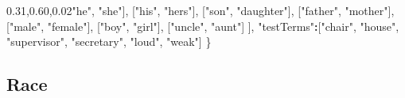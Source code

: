 \documentclass[12pt,]{book}
\newenvironment{Shaded}{\begin{snugshade}}{\end{snugshade}}
\newcommand{\StringTok}[1]{\textcolor[rgb]{0.31,0.60,0.02}{#1}}
\newcommand{\OperatorTok}[1]{\textcolor[rgb]{0.81,0.36,0.00}{\textbf{#1}}}
\newcommand{\NormalTok}[1]{#1}
\begin{document}
\begin{Shaded}
\begin{Highlighting}[]
\NormalTok{        [}\StringTok{"he"}\NormalTok{, }\StringTok{"she"}\NormalTok{],}
\NormalTok{        [}\StringTok{"his"}\NormalTok{, }\StringTok{"hers"}\NormalTok{],}
\NormalTok{        [}\StringTok{"son"}\NormalTok{, }\StringTok{"daughter"}\NormalTok{],}
\NormalTok{        [}\StringTok{"father"}\NormalTok{, }\StringTok{"mother"}\NormalTok{],}
\NormalTok{        [}\StringTok{"male"}\NormalTok{, }\StringTok{"female"}\NormalTok{],}
\NormalTok{        [}\StringTok{"boy"}\NormalTok{, }\StringTok{"girl"}\NormalTok{],}
\NormalTok{        [}\StringTok{"uncle"}\NormalTok{, }\StringTok{"aunt"}\NormalTok{]}
\NormalTok{    ], }
    \StringTok{"testTerms"}\OperatorTok{:}\NormalTok{[}\StringTok{"chair"}\NormalTok{, }\StringTok{"house"}\NormalTok{, }\StringTok{"supervisor"}\NormalTok{, }\StringTok{"secretary"}\NormalTok{, }\StringTok{"loud"}\NormalTok{, }\StringTok{"weak"}\NormalTok{]}
\NormalTok{\}}
\end{Highlighting}
\end{Shaded}

\normalsize

\subsection*{Race}\label{race}

\vspace{1mm} \scriptsize
\end{document}
